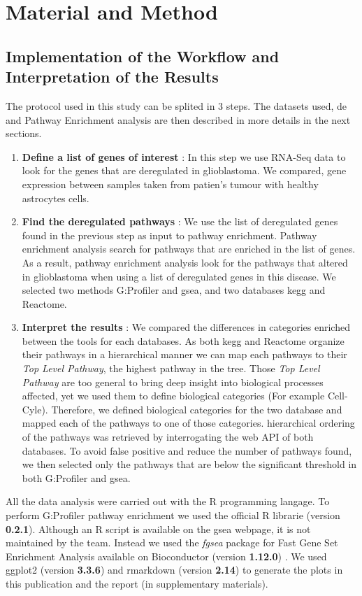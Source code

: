 \section{Material and Method}

\subsection{Implementation of the Workflow and Interpretation of the Results}

The protocol used in this study can be splited in 3 steps. 
The datasets used, \acrfull{de} and Pathway Enrichment analysis are then described in more details in the next sections.
\begin{enumerate}
    \item \textbf{Define a list of genes of interest} : In this step we use RNA-Seq data to look for the genes that are deregulated in glioblastoma. 
    We compared, gene expression between samples taken from patien's tumour with healthy astrocytes cells.
    \item \textbf{Find the deregulated pathways} : We use the list of deregulated genes found in the previous step as input to pathway enrichment.
    Pathway enrichment analysis search for pathways that are enriched in the list of genes.
    As a result, pathway enrichment analysis look for the pathways that altered in glioblastoma when using a list of deregulated genes in this disease.
    We selected two methods G:Profiler and \acrfull{gsea}, and two databases \acrfull{kegg} and Reactome.
    \item \textbf{Interpret the results} : We compared the differences in categories enriched between the tools for each databases.
    As both \acrshort{kegg} and Reactome organize their pathways in a hierarchical manner we can map each pathways to their \textit{Top Level Pathway}, the highest pathway in the tree.
    Those \textit{Top Level Pathway} are too general to bring deep insight into biological processes affected, yet we used them to define biological categories (For example Cell-Cyle).
    Therefore, we defined biological categories for the two database and mapped each of the pathways to one of those categories.
    hierarchical ordering of the pathways was retrieved by interrogating the web API of both databases.
    To avoid false positive and reduce the number of pathways found, we then selected only the pathways that are below the significant threshold in both G:Profiler and \acrshort{gsea}.
\end{enumerate}
All the data analysis were carried out with the R programming langage.
To perform G:Profiler pathway enrichment we used the official R librarie (version \textbf{0.2.1}).
Although an R script is available on the \acrshort{gsea} webpage, it is not maintained by the team.
Instead we used the \textit{fgsea} package for Fast Gene Set Enrichment Analysis available on Bioconductor (version \textbf{1.12.0}) \cite*{Korotkevich2021}.
We used ggplot2 (version \textbf{3.3.6}) and rmarkdown (version \textbf{2.14}) to generate the plots in this publication and the report (in supplementary materials).

